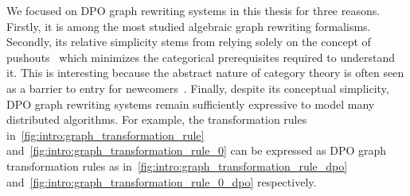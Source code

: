    We focused on DPO graph rewriting systems in this thesis for three reasons.
   Firstly, it is among the most studied algebraic graph rewriting formalisms.
   Secondly, its relative simplicity stems from relying solely on the concept of pushouts~\cite{pierce1991basic} which minimizes the categorical prerequisites required to understand it. This is interesting because the abstract nature of category theory is often seen as a barrier to entry for newcomers~\cite{overbeekthesis}.
    Finally, despite its conceptual simplicity, DPO graph rewriting systems remain sufficiently expressive to model many distributed algorithms. For example, the transformation rules in~\autoref{fig:intro:graph_transformation_rule} and~\autoref{fig:intro:graph_transformation_rule_0} can be expressed as DPO graph transformation rules as in~\autoref{fig:intro:graph_transformation_rule_dpo} and~\autoref{fig:intro:graph_transformation_rule_0_dpo} respectively.
    \begin{figure}[!htbp]
    \centering
    \caption{}
    \label{fig:intro:graph_transformation_rule_dpo}
\end{figure}
